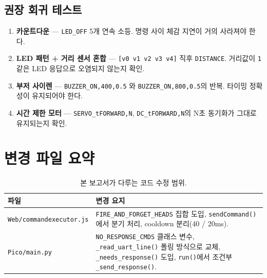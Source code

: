 \documentclass[11pt, oneside]{article}
\begin{document}
\subsection{권장 회귀 테스트}

\begin{enumerate}
  \item \textbf{카운트다운} — \texttt{LED\_OFF} 5개 연속 소등. 명령
        사이 체감 지연이 거의 사라져야 한다.
  \item \textbf{LED 패턴 + 거리 센서 혼합} — \texttt{[v0 v1 v2 v3 v4]}
        직후 \texttt{DISTANCE}. 거리값이 \texttt{1} 같은 LED 응답으로
        오염되지 않는지 확인.
  \item \textbf{부저 사이렌} — \texttt{BUZZER\_ON,400,0.5} 와
        \texttt{BUZZER\_ON,800,0.5}의 반복. 타이밍 정확성이 유지되어야
        한다.
  \item \textbf{시간 제한 모터} — \texttt{SERVO\_tFORWARD,N},
        \texttt{DC\_tFORWARD,N}의 N초 동기화가 그대로 유지되는지 확인.
\end{enumerate}

\section{변경 파일 요약}

\begin{table}[h]
\centering
\small
\begin{tabularx}{\linewidth}{@{}lX@{}}
\toprule
파일 & 변경 요지 \\
\midrule
\texttt{Web/commandexecutor.js} & \texttt{FIRE\_AND\_FORGET\_HEADS} 집합 도입, \texttt{sendCommand()}에서 분기 처리, cooldown 분리(40 / 20ms). \\
\texttt{Pico/main.py} & \texttt{NO\_RESPONSE\_CMDS} 클래스 변수, \texttt{\_read\_uart\_line()} 폴링 방식으로 교체, \texttt{\_needs\_response()} 도입, \texttt{run()}에서 조건부 \texttt{\_send\_response()}. \\
\bottomrule
\end{tabularx}
\caption{본 보고서가 다루는 코드 수정 범위.}
\end{table}
\end{document}
